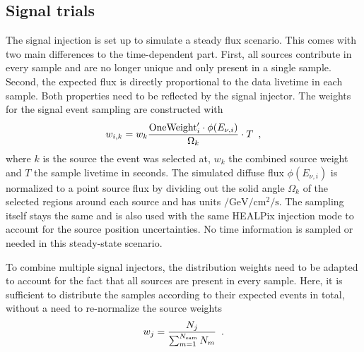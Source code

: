 \subsection*{Signal trials}
The signal injection is set up to simulate a steady flux scenario.
This comes with two main differences to the time-dependent part.
First, all sources contribute in every sample and are no longer unique and only present in a single sample.
Second, the expected flux is directly proportional to the data livetime in each sample.
Both properties need to be reflected by the signal injector.
The weights for the signal event sampling are constructed with
\begin{equation}
  w_{i,k} = w_k \frac{\text{OneWeight}'_i \cdot
    \phi(E_{\nu,i})}{\Omega_k} \cdot T
  \enspace\text{,}
\end{equation}
where $k$ is the source the event was selected at, $w_k$ the combined source weight and $T$ the sample livetime in seconds.
The simulated diffuse flux $\phi(E_{\nu,i})$ is normalized to a point source flux by dividing out the solid angle $\Omega_k$ of the selected regions around each source and has units $\si{\per\GeV\per\cm\squared\per\second}$.
The sampling itself stays the same and is also used with the same HEALPix injection mode to account for the source position uncertainties.
No time information is sampled or needed in this steady-state scenario.

To combine multiple signal injectors, the distribution weights need to be adapted to account for the fact that all sources are present in every sample.
Here, it is sufficient to distribute the samples according to their expected events in total, without a need to re-normalize the source weights
\begin{equation}
  w_j = \frac{N_j}{\sum_{m=1}^{N_\text{sam}}N_m}
  \enspace\text{.}
\end{equation}


